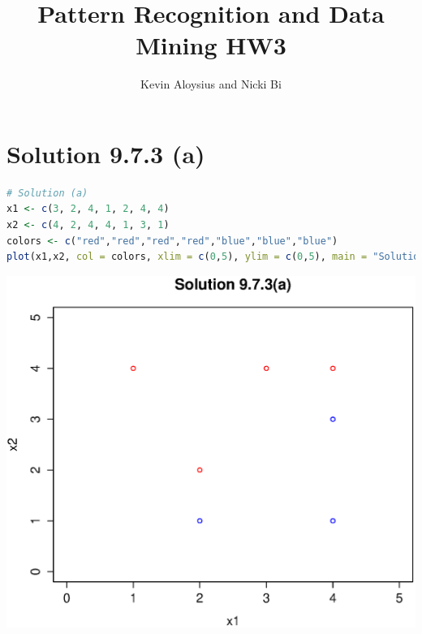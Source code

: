 \documentclass[a4paper,10pt]{article}
\title{Pattern Recognition and Data Mining HW3}
\author{Kevin Aloysius and Nicki Bi}
\begin{document}
\maketitle

\section{Solution 9.7.3 (a)}
\begin{lstlisting}[language=R]
# Solution (a)
x1 <- c(3, 2, 4, 1, 2, 4, 4)
x2 <- c(4, 2, 4, 4, 1, 3, 1)
colors <- c("red","red","red","red","blue","blue","blue")
plot(x1,x2, col = colors, xlim = c(0,5), ylim = c(0,5), main = "Solution 9.7.3(a)")
\end{lstlisting}
\begin{center}
\includegraphics[scale=0.70]{first}
\end{center}
\end{document}

